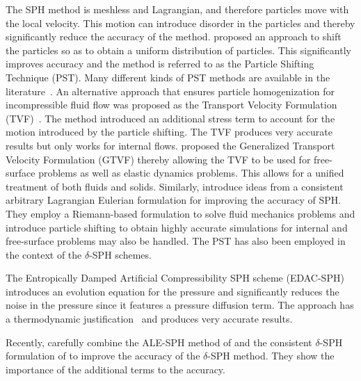 


The SPH method is meshless and Lagrangian, and therefore particles move with the
local velocity. This motion can introduce disorder in the particles and thereby
significantly reduce the accuracy of the method. \cite{acc_stab_xu:jcp:2009}
proposed an approach to shift the particles so as to obtain a uniform
distribution of particles. This significantly improves accuracy and the method
is referred to as the Particle Shifting Technique (PST). Many different kinds of
PST methods are available in the
literature~\citep{diff_smoothing_sph:lind:jcp:2012,fickian_smoothing_sph:skillen:cmame:2013,huang_kernel_2019,ye2019sph}.
An alternative approach that ensures particle homogenization for incompressible
fluid flow was proposed as the Transport Velocity Formulation
(TVF)~\citep{Adami2013}. The method introduced an additional stress term to
account for the motion introduced by the particle shifting. The TVF produces
very accurate results but only works for internal flows. \cite{zhang_hu_adams17}
proposed the Generalized Transport Velocity Formulation (GTVF) thereby allowing
the TVF to be used for free-surface problems as well as elastic dynamics
problems. This allows for a unified treatment of both fluids and solids.
Similarly, \cite{oger_ale_sph_2016} introduce ideas from a consistent arbitrary
Lagrangian Eulerian formulation for improving the accuracy of SPH. They employ a
Riemann-based formulation to solve fluid mechanics problems and introduce
particle shifting to obtain highly accurate simulations for internal and
free-surface problems may also be handled. The PST has also been employed in the
context of the $\delta$-SPH schemes\citep{sun_consistent_2019}.


The Entropically Damped Artificial Compressibility SPH scheme
(EDAC-SPH)~\citep{edac-sph:cf:2019} introduces an evolution equation for the
pressure and significantly reduces the noise in the pressure since it features
a pressure diffusion term. The approach has a thermodynamic
justification~\citep{Clausen2013} and produces very accurate
results.


Recently, \cite{antuono2021delta} carefully combine the ALE-SPH method of
\cite{oger_ale_sph_2016} and the consistent $\delta$-SPH formulation of
\cite{sun_consistent_2019} to improve the accuracy of the $\delta$-SPH
method. They show the importance of the additional terms to the accuracy.


